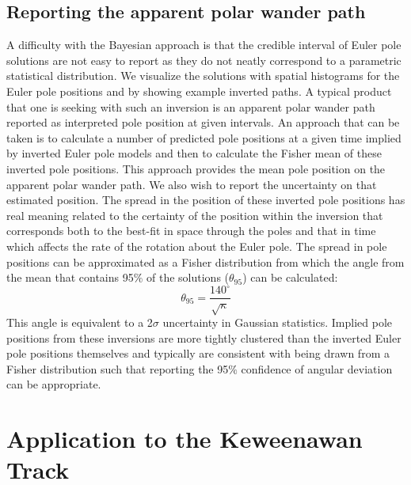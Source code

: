 \documentclass[11pt,letterpaper]{article}
\begin{document}
\subsection*{Reporting the apparent polar wander path}
\label{sec:age_uncertainty}
A difficulty with the Bayesian approach is that the credible interval of Euler pole solutions are not easy to report as they do not neatly correspond to a parametric statistical distribution. We visualize the solutions with spatial histograms for the Euler pole positions and by showing example inverted paths. A typical product that one is seeking with such an inversion is an apparent polar wander path reported as interpreted pole position at given intervals. An approach that can be taken is to calculate a number of predicted pole positions at a given time implied by inverted Euler pole models and then to calculate the Fisher mean of these inverted pole positions. This approach provides the mean pole position on the apparent polar wander path. We also wish to report the uncertainty on that estimated position. The spread in the position of these inverted pole positions has real meaning related to the certainty of the position within the inversion that corresponds both to the best-fit in space through the poles and that in time which affects the rate of the rotation about the Euler pole. The spread in pole positions can be approximated as a Fisher distribution from which the angle from the mean that contains 95$\%$ of the solutions ($\theta_{95}$) can be calculated:
\begin{equation}
\theta_{95}=\frac{140^{\circ}}{\sqrt{\kappa}}
\label{eq:angular_deviation}
\end{equation}
This angle is equivalent to a 2$\sigma$ uncertainty in Gaussian statistics. Implied pole positions from these inversions are more tightly clustered than the inverted Euler pole positions themselves and typically are consistent with being drawn from a Fisher distribution such that reporting the 95$\%$ confidence of angular deviation can be appropriate.

\section*{Application to the Keweenawan Track}
\label{sec:keweenawan}
\end{document}
